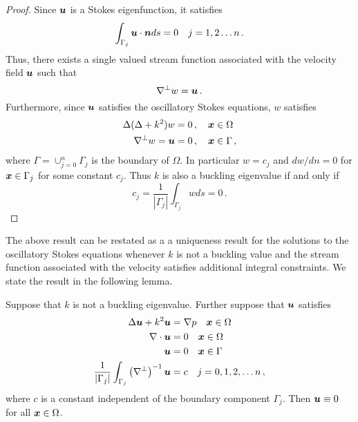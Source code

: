 \begin{proof}
Since ${\boldsymbol u}$ is a Stokes eigenfunction, it satisfies
\begin{equation}
\int_{\Gamma_{j}} {\boldsymbol u} \cdot {\boldsymbol n} ds = 0 \quad j=1,2\ldots n \, .
\end{equation}
Thus, there exists a single valued stream function associated with the
velocity field ${\boldsymbol u}$ such that 
\begin{equation}
\nabla^{\perp} w = {\boldsymbol u} \, .
\end{equation}
Furthermore, since ${\boldsymbol u}$ satisfies the oscillatory Stokes equations, 
$w$ satisfies
\begin{align}
\Delta (\Delta + k^{2} ) w &= 0 \, , \quad {\boldsymbol x} \in \Omega \\
\nabla^{\perp} w = {\boldsymbol u} &=0 \, ,\quad {\boldsymbol x} \in \Gamma \, ,
\end{align}
where $\Gamma = \cup_{j=0}^{n} \Gamma_{j}$ is the boundary of $\Omega$.
In particular $w= c_{j}$ and $dw/dn = 0$ for ${\boldsymbol x} \in \Gamma_{j}$ for
some constant $c_{j}$.
Thus $k$ is also a buckling eigenvalue if and only if 
\begin{equation}
c_{j} = \frac{1}{|\Gamma_{j}|}\int_{\Gamma_{j}} w ds =  0 \, .
\end{equation}
\end{proof}

The above result can be restated as a 
a uniqueness result for the 
solutions to the oscillatory Stokes equations whenever $k$ is
not a buckling value and the stream function associated with the
velocity satisfies additional integral constraints.
We state the result in the following lemma.
\begin{lem}
\label{lem:conshelmbieig}
Suppose that $k$ is not a buckling eigenvalue. 
Further suppose that ${\boldsymbol u}$ satisfies
\begin{align}
\Delta {\boldsymbol u} + k^{2} {\boldsymbol u} &= \nabla p \quad {\boldsymbol x} \in \Omega \\
\nabla \cdot {\boldsymbol u} &=0 \quad {\boldsymbol x} \in \Omega \\
{\boldsymbol u} &=0 \quad {\boldsymbol x} \in \Gamma \\
\frac{1}{|\Gamma_{j}|}
\int_{\Gamma_{j}} \left(\nabla^{\perp} \right)^{-1} {\boldsymbol u} &= c \quad
j=0,1,2,\ldots n\, ,
\end{align}
where $c$ is a constant independent of the boundary component $\Gamma_{j}$.
Then ${\boldsymbol u} \equiv 0$ for all ${\boldsymbol x} \in \Omega$.
\end{lem}


